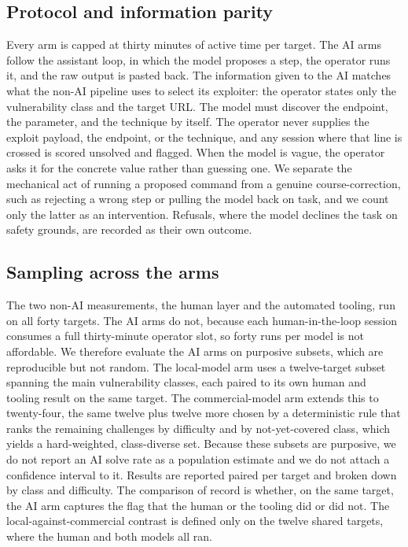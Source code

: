 \documentclass[11pt]{article}
\begin{document}
\subsection{Protocol and information parity}
Every arm is capped at thirty minutes of active time per target. The AI arms follow the assistant loop, in which the model proposes a step, the operator runs it, and the raw output is pasted back. The information given to the AI matches what the non-AI pipeline uses to select its exploiter: the operator states only the vulnerability class and the target URL. The model must discover the endpoint, the parameter, and the technique by itself. The operator never supplies the exploit payload, the endpoint, or the technique, and any session where that line is crossed is scored unsolved and flagged. When the model is vague, the operator asks it for the concrete value rather than guessing one. We separate the mechanical act of running a proposed command from a genuine course-correction, such as rejecting a wrong step or pulling the model back on task, and we count only the latter as an intervention. Refusals, where the model declines the task on safety grounds, are recorded as their own outcome.

\subsection{Sampling across the arms}
The two non-AI measurements, the human layer and the automated tooling, run on all forty targets. The AI arms do not, because each human-in-the-loop session consumes a full thirty-minute operator slot, so forty runs per model is not affordable. We therefore evaluate the AI arms on purposive subsets, which are reproducible but not random. The local-model arm uses a twelve-target subset spanning the main vulnerability classes, each paired to its own human and tooling result on the same target. The commercial-model arm extends this to twenty-four, the same twelve plus twelve more chosen by a deterministic rule that ranks the remaining challenges by difficulty and by not-yet-covered class, which yields a hard-weighted, class-diverse set. Because these subsets are purposive, we do not report an AI solve rate as a population estimate and we do not attach a confidence interval to it. Results are reported paired per target and broken down by class and difficulty. The comparison of record is whether, on the same target, the AI arm captures the flag that the human or the tooling did or did not. The local-against-commercial contrast is defined only on the twelve shared targets, where the human and both models all ran.
\end{document}
